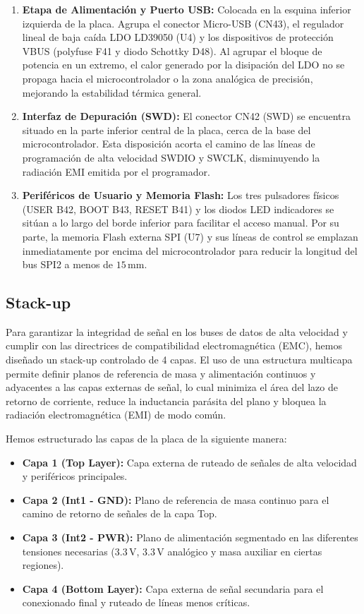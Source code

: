 \documentclass[12pt,a4paper]{article}
\begin{document}
\begin{enumerate}
    \item \textbf{Etapa de Alimentación y Puerto USB:} Colocada en la esquina inferior izquierda de la placa. Agrupa el conector Micro-USB (CN43), el regulador lineal de baja caída LDO LD39050 (U4) y los dispositivos de protección VBUS (polyfuse F41 y diodo Schottky D48). Al agrupar el bloque de potencia en un extremo, el calor generado por la disipación del LDO no se propaga hacia el microcontrolador o la zona analógica de precisión, mejorando la estabilidad térmica general.
    \item \textbf{Interfaz de Depuración (SWD):} El conector CN42 (SWD) se encuentra situado en la parte inferior central de la placa, cerca de la base del microcontrolador. Esta disposición acorta el camino de las líneas de programación de alta velocidad SWDIO y SWCLK, disminuyendo la radiación EMI emitida por el programador.
    \item \textbf{Periféricos de Usuario y Memoria Flash:} Los tres pulsadores físicos (USER B42, BOOT B43, RESET B41) y los diodos LED indicadores se sitúan a lo largo del borde inferior para facilitar el acceso manual. Por su parte, la memoria Flash externa SPI (U7) y sus líneas de control se emplazan inmediatamente por encima del microcontrolador para reducir la longitud del bus SPI2 a menos de $15\,\text{mm}$.
\end{enumerate}

\subsection{Stack-up}

Para garantizar la integridad de señal en los buses de datos de alta velocidad y cumplir con las directrices de compatibilidad electromagnética (EMC), hemos diseñado un stack-up controlado de 4 capas. El uso de una estructura multicapa permite definir planos de referencia de masa y alimentación continuos y adyacentes a las capas externas de señal, lo cual minimiza el área del lazo de retorno de corriente, reduce la inductancia parásita del plano y bloquea la radiación electromagnética (EMI) de modo común.

Hemos estructurado las capas de la placa de la siguiente manera:
\begin{itemize}
    \item \textbf{Capa 1 (Top Layer):} Capa externa de ruteado de señales de alta velocidad y periféricos principales.
    \item \textbf{Capa 2 (Int1 - GND):} Plano de referencia de masa continuo para el camino de retorno de señales de la capa Top.
    \item \textbf{Capa 3 (Int2 - PWR):} Plano de alimentación segmentado en las diferentes tensiones necesarias ($3.3\,\text{V}$, $3.3\,\text{V}$ analógico y masa auxiliar en ciertas regiones).
    \item \textbf{Capa 4 (Bottom Layer):} Capa externa de señal secundaria para el conexionado final y ruteado de líneas menos críticas.
\end{itemize}
\end{document}
